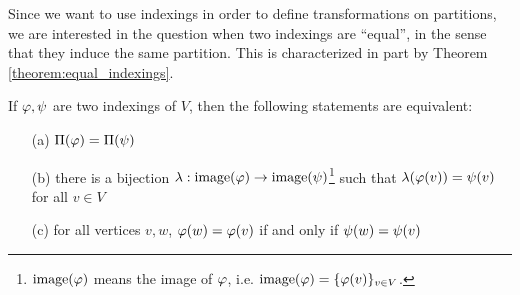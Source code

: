 Since we want to use indexings in order to define transformations on partitions, we are interested in the question when two indexings are ``equal'', in the sense that they induce the same partition. This is characterized in part by Theorem \ref{theorem:equal_indexings}.

\begin{theoremrep}
    If $\varphi,\psi$ are two indexings of $V$, then the following statements are equivalent:
    \begin{enumerate}
        \item[(a)] $\Pi(\varphi)=\Pi(\psi)$
        \item[(b)] there is a bijection $\lambda : \mathrm{image}(\varphi) \rightarrow \mathrm{image}(\psi)$\footnote{$\mathrm{image}(\varphi)$ means the image of $\varphi$, i.e. $\mathrm{image}(\varphi)=\{ \varphi(v) \}_{v \in V}$.} such that $\lambda(\varphi(v)) = \psi(v)$ \\ for all $v \in V$
        \item[(c)] for all vertices $v,w$, $\varphi(w) = \varphi(v)$ if and only if $\psi(w) = \psi(v)$
    \end{enumerate} \label{theorem:equal_indexings}
\end{theoremrep}
